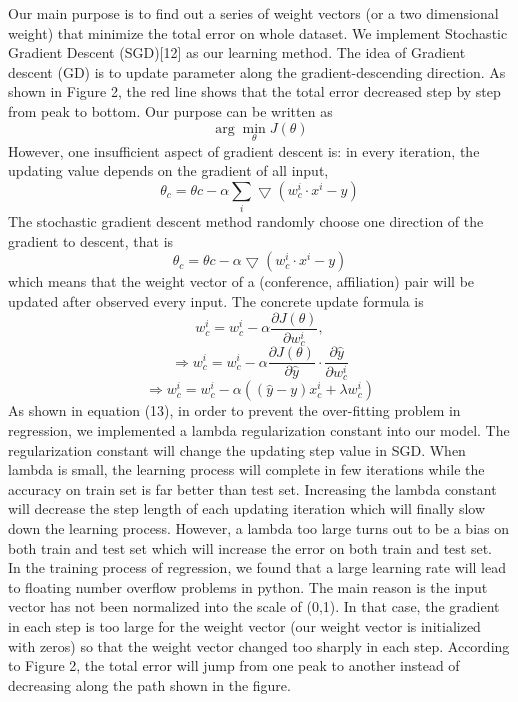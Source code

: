 \documentclass[letterpaper]{article}
\begin{document}
Our main purpose is to find out a series of weight vectors (or a two dimensional weight) that minimize the total error on whole dataset. We implement Stochastic Gradient Descent (SGD)[12] as our learning method. The idea of Gradient descent (GD) is to update parameter along the gradient-descending direction. As shown in Figure 2, the red line shows that the total error decreased step by step from peak to bottom. Our purpose can be written as
\begin{equation}
    \arg \min_{\theta} J\left (\theta \right )
\end{equation}
However, one insufficient aspect of gradient descent is: in every iteration, the updating value depends on the gradient of all input,
\begin{equation}
    \theta_{c} = \theta{c} - \alpha \sum_{i}\bigtriangledown \left( w_{c}^{i}\cdot x^{i} - y\right)
\end{equation}
The stochastic gradient descent method randomly choose one direction of the gradient to descent, that is
\begin{equation}
    \theta_{c} = \theta{c} - \alpha  \bigtriangledown \left( w_{c}^{i}\cdot x^{i} - y\right)
\end{equation}
which means that the weight vector of a (conference, affiliation) pair will be updated after observed every input. The concrete update formula is 
\begin{equation}
    w_{c}^{i} = w_{c}^{i} - \alpha \frac{\partial J \left( \theta \right )}{\partial w_c^i},
\end{equation}
\begin{equation}
   \Rightarrow w_{c}^{i} = w_{c}^{i} - \alpha \frac{\partial J \left( \theta \right )}{\partial \hat{y}}\cdot \frac{\partial \hat{y}}{\partial w_c^i}
\end{equation}
\begin{equation}
   \Rightarrow w_{c}^{i} = w_{c}^{i} - \alpha \left( \left( \hat{y}-y\right)x_c^i + \lambda w_c^i\right)
\end{equation}
As shown in equation (13), in order to prevent the over-fitting problem in regression, we implemented a lambda regularization constant into our model. The regularization constant will change the updating step value in SGD. When lambda is small, the learning process will complete in few iterations while the accuracy on train set is far better than test set. Increasing the lambda constant will decrease the step length of each updating iteration which will finally slow down the learning process. However, a lambda too large turns out to be a bias on both train and test set which will increase the error on both train and test set.\\
In the training process of regression, we found that a large learning rate will lead to floating number overflow problems in python. The main reason is the input vector has not been normalized into the scale of (0,1). In that case, the gradient in each step is too large for the weight vector (our weight vector is initialized with zeros) so that the weight vector changed too sharply in each step. According to Figure 2, the total error will jump from one peak to another instead of decreasing along the path shown in the figure.
\end{document}
